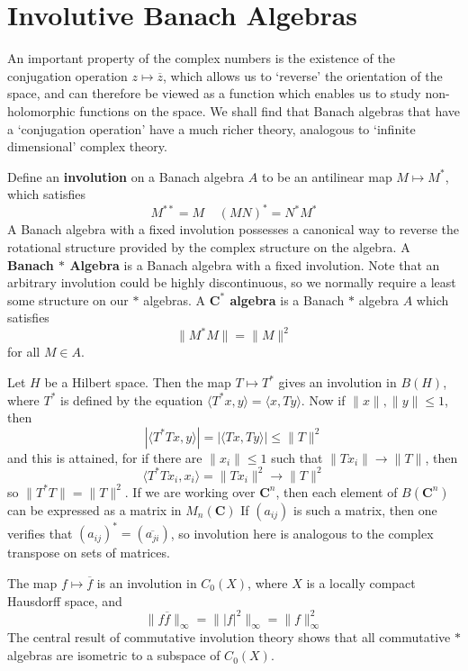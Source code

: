 \chapter{Involutive Banach Algebras}

An important property of the complex numbers is the existence of the conjugation operation $z \mapsto \overline{z}$, which allows us to `reverse' the orientation of the space, and can therefore be viewed as a function which enables us to study non-holomorphic functions on the space. We shall find that Banach algebras that have a `conjugation operation' have a much richer theory, analogous to `infinite dimensional' complex theory.

Define an {\bf involution} on a Banach algebra $A$ to be an antilinear map $M \mapsto M^*$, which satisfies
%
\[ M^{**} = M\ \ \ \ \ (MN)^* = N^*M^* \]
%
A Banach algebra with a fixed involution possesses a canonical way to reverse the rotational structure provided by the complex structure on the algebra. A {\bf Banach $*$ Algebra} is a Banach algebra with a fixed involution. Note that an arbitrary involution could be highly discontinuous, so we normally require a least some structure on our $*$ algebras. A {\bf $\mathbf{C}^*$ algebra} is a Banach $*$ algebra $A$ which satisfies
%
\[ \| M^* M \| = \| M \|^2 \]
%
for all $M \in A$.

\begin{example}
    Let $H$ be a Hilbert space. Then the map $T \mapsto T^*$ gives an involution in $B(H)$, where $T^*$ is defined by the equation $\langle T^* x, y \rangle = \langle x, Ty \rangle$. Now if $\| x \|, \| y \| \leq 1$, then
    \[ | \langle T^* T x, y \rangle | = | \langle Tx, Ty \rangle | \leq \| T \|^2 \]
    and this is attained, for if there are $\| x_i \| \leq 1$ such that $\| Tx_i \| \to \| T \|$, then
    \[ \langle T^* T x_i, x_i \rangle = \| Tx_i \|^2 \to \| T \|^2 \]
    so $\| T^* T \| = \| T \|^2$. If we are working over $\mathbf{C}^n$, then each element of $B(\mathbf{C}^n)$ can be expressed as a matrix in $M_n(\mathbf{C})$ If $(a_{ij})$ is such a matrix, then one verifies that $(a_{ij})^* = (\overline{a_{ji}})$, so involution here is analogous to the complex transpose on sets of matrices.
\end{example}

\begin{example}
    The map $f \mapsto \overline{f}$ is an involution in $C_0(X)$, where $X$ is a locally compact Hausdorff space, and
    \[ \| f \overline{f} \|_\infty = \| |f|^2 \|_\infty = \| f \|^2_\infty \]
    The central result of commutative involution theory shows that all commutative $*$ algebras are isometric to a subspace of $C_0(X)$.
\end{example}

